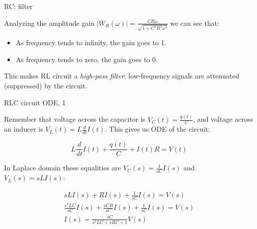 \documentclass{beamer}
\begin{document}
\begin{frame}{RC: filter}
	\begin{flushleft}
		
		Analyzing the amplitude gain $| W_R(\omega) | 
		=  \frac{ CR\omega}{\sqrt{1 + C^2 R^2 \omega^2}} $ we can see that:
		
		\bigskip
		
		\begin{itemize}
			\item As frequency tends to infinity, the gain goes to 1.
			
			\item As frequency tends to zero, the gain goes to 0.
		\end{itemize}
		
		\bigskip
		
		This makes RL circuit a \emph{high-pass filter}: low-frequency signals are attenuated (suppressed) by the circuit.
		
	\end{flushleft}
\end{frame}



\begin{frame}{RLC circuit ODE, 1}
	\begin{flushleft}
		
		Remember that voltage across the capacitor is $V_C(t) = \frac{q(t)}{C}$, and voltage across an inducer is $V_L(t) = L \frac{d}{dt}I(t)$. This gives us ODE of the circuit:
		
		\begin{equation}
			L \frac{d}{dt}I(t) + \frac{q(t)}{C} + I(t)R = V(t)
		\end{equation}
	
		In Laplace domain these equalities are $V_C(s) = \frac{1}{sC} I(s)$ and $V_L(s) = sLI(s)$:
		
		\begin{align}
			 sLI(s) + RI(s) + \frac{1}{sC} I(s) = V(s) \\
			 \frac{s^2LC}{sC}I(s) + \frac{sCR}{sC}I(s) + \frac{1}{sC} I(s) = V(s) \\
			 I(s) = \frac{sC}{s^2 LC + s RC + 1} V(s)
		\end{align}
		
		
	\end{flushleft}
\end{frame}
\end{document}
